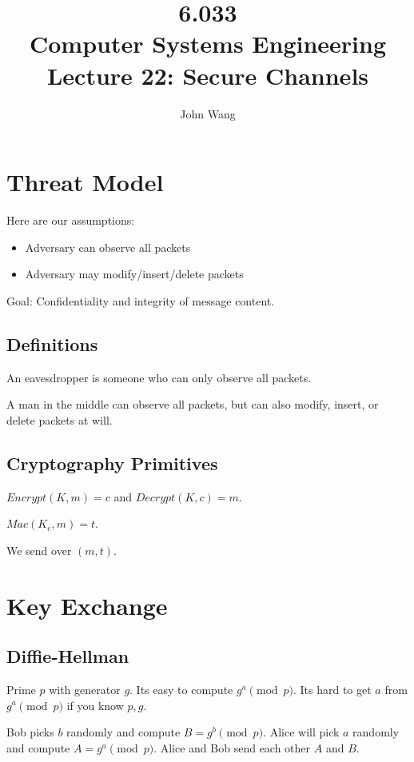 \documentclass[psamsfonts]{amsart}
\title{6.033 \\
Computer Systems Engineering \\
Lecture 22: Secure Channels}
\author{John Wang}
\begin{document}
\maketitle

\section{Threat Model}

Here are our assumptions:
\begin{itemize}
  \item Adversary can observe all packets
  \item Adversary may modify/insert/delete packets
\end{itemize}

Goal: Confidentiality and integrity of message content.

\subsection{Definitions}

An eavesdropper is someone who can only observe all packets.

A man in the middle can observe all packets, but can also modify, insert, or delete packets at will.

\subsection{Cryptography Primitives}

$Encrypt(K, m) = c$ and $Decrypt(K, c) = m$.

$Mac(K_e, m) = t$.

We send over $(m,t)$.

\section{Key Exchange}

\subsection{Diffie-Hellman}

Prime $p$ with generator $g$. Its easy to compute $g^a \pmod{p}$. Its hard to get $a$ from $g^a \pmod{p}$ if you know $p, g$.

Bob picks $b$ randomly and compute $B = g^{b} \pmod{p}$. Alice will pick $a$ randomly and compute $A = g^{a} \pmod{p}$. Alice and Bob send each other $A$ and $B$.
\end{document}
